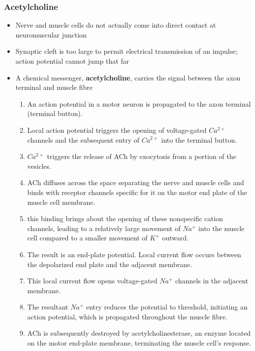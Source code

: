 \documentclass[11pt]{article}
\begin{document}
\subsubsection{Acetylcholine}
\begin{itemize}
\item Nerve and muscle cells do not actually come into direct contact at neuromuscular junction
\item Synaptic cleft is too large to permit electrical transmission of an impulse; action potential cannot jump that far
\item A chemical messenger, \textbf{acetylcholine}, carries the signal between the axon terminal and muscle fibre
\begin{enumerate}
\item An action potential in a motor neuron is propagated to the axon terminal (terminal button).
\item Local action potential triggers the opening of voltage-gated $Ca^{2+}$ channels and the subsequent entry of $Ca^{2+}$ into the terminal button.
\item $Ca^{2+}$ triggers the release of ACh by exocytosis from a portion of the vesicles.
\item ACh diffuses across the space separating the nerve and muscle cells and binds with receptor channels specific for it on the motor end plate of the muscle cell membrane.
\item this binding brings about the opening of these nonspecific cation channels, leading to a relatively large movement of $Na^+$ into the muscle cell compared to a smaller movement of $K^+$ outward.
\item The result is an end-plate potential. Local current flow occurs between the depolarized end plate and the adjacent membrane.
\item This local current flow opens voltage-gated $Na^+$ channels in the adjacent membrane.
\item The resultant $Na^+$ entry reduces the potential to threshold, initiating an action potential, which is propagated throughout the muscle fibre.
\item ACh is subsequently destroyed by acetylcholinesterase, an enzyme located on the motor end-plate membrane, terminating the muscle cell’s response.
\end{enumerate}
\end{itemize}
\end{document}
